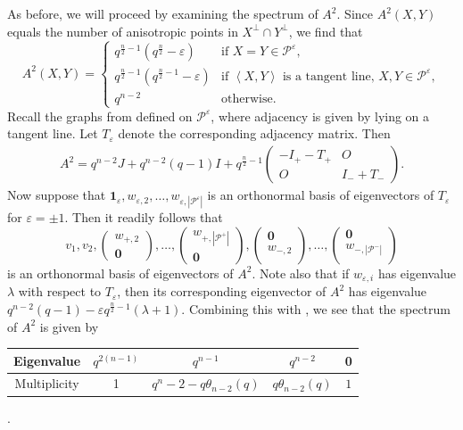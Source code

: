 \documentclass[a4paper]{article}
\theoremstyle{definition}
\newcommand{\eps}{\varepsilon}
\newcommand{\vspan}[1]{\left \langle #1 \right \rangle}
\newcommand{\one}{\mathbf 1}
\newcommand{\zero}{\mathbf 0}
\newcommand{\pp}{\mathcal P}
\begin{document}
As before, we will proceed by examining the spectrum of $A^2$.
Since $A^2(X,Y)$ equals the number of anisotropic points in $X^\perp \cap Y^\perp$, we find that
\[
 A^2(X,Y) = \begin{cases}
  q^{\frac n2 - 1} \left( q^\frac n2 - \eps \right) & \text{if } X = Y \in \pp^\eps, \\
  q^{\frac n2 - 1} \left( q^{\frac n2 - 1} - \eps \right) & \text{if $\vspan{X,Y}$ is a tangent line, $X,Y \in \pp^\eps$}, \\
  q^{n-2} & \text{otherwise}.
 \end{cases}
\]
Recall the graphs from  defined on $\pp^\eps$, where adjacency is given by lying on a tangent line.
Let $T_\eps$ denote the corresponding adjacency matrix.
Then
\begin{align*}
 A^2 = q^{n-2} J + q^{n-2}(q-1) I + q^{\frac n2 - 1} \begin{pmatrix}
  - I_+ - T_+ & O \\
  O &  I_- + T_-
 \end{pmatrix}.
\end{align*}
Now suppose that $\one_\eps, w_{\eps,2}, \dots, w_{\eps,|\pp^\eps|}$ is an orthonormal basis of eigenvectors of $T_\eps$ for $\eps = \pm 1$.
Then it readily follows that
\[
 v_1, v_2, 
 \begin{pmatrix} w_{+,2} \\ \zero \end{pmatrix}, \dots,
 \begin{pmatrix} w_{+,|\pp^+|} \\ \zero \end{pmatrix},
 \begin{pmatrix} \zero \\ w_{-,2} \\ \end{pmatrix}, \dots,
 \begin{pmatrix} \zero \\ w_{-,|\pp^-|} \\ \end{pmatrix}
\]
is an orthonormal basis of eigenvectors of $A^2$.
Note also that if $w_{\eps,i}$ has eigenvalue $\lambda$ with respect to $T_\eps$, then its corresponding eigenvector of $A^2$ has eigenvalue $q^{n-2}(q-1) - \eps q^{\frac n2 - 1}(\lambda + 1)$.
Combining this with , we see that the spectrum of $A^2$ is given by
\begin{center}
 \begin{tabular}{c || c | c | c | c}
  Eigenvalue & $q^{2(n-1)}$ & $q^{n-1}$ & $q^{n-2}$ & 0 \\ \hline
  Multiplicity & 1 & $q^n - 2 - q \theta_{n-2}(q)$ & $q \theta_{n-2}(q)$ & $1$
 \end{tabular}\:.
\end{center}
\end{document}
